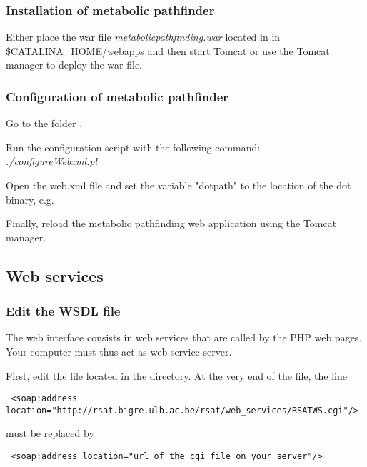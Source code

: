 \documentclass{book}
\begin{document}
\subsubsection{Installation of metabolic pathfinder}
Either place the war file \textit{metabolicpathfinding.war} located
in  in\\
\$CATALINA\_HOME/webapps and then start
Tomcat or use the Tomcat manager to deploy the war file.

\subsubsection{Configuration of metabolic pathfinder}
Go to the folder
.

Run the configuration script with the following command:\\
\textit{./configureWebxml.pl}

Open the web.xml file and set the variable "dotpath" to the location
of the dot binary, e.g. 

Finally, reload the metabolic pathfinding web application using the Tomcat manager.

\subsection{Web services}

\subsubsection{Edit the WSDL file}
The web interface consists in web services that are called by the PHP web pages. Your computer must thus act as web service server.

First, edit the file  located in the
 directory.
At the very end of the file, the line

\begin{footnotesize}
\begin{verbatim}
 <soap:address location="http://rsat.bigre.ulb.ac.be/rsat/web_services/RSATWS.cgi"/>
\end{verbatim}
\end{footnotesize}

must be replaced by

\begin{footnotesize}
\begin{verbatim}
 <soap:address location="url_of_the_cgi_file_on_your_server"/>
\end{verbatim}
\end{footnotesize}
\end{document}
